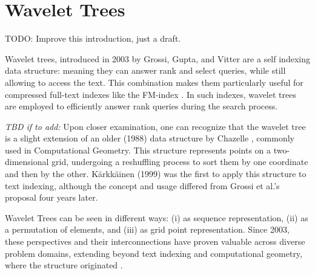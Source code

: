 \clearpage
\section{Wavelet Trees}
TODO: Improve this introduction, just a draft. \vspace{0.4cm}


\noindent Wavelet trees, introduced in 2003 by Grossi, Gupta, and Vitter \cite{GrossiWT2003,} are a self indexing data structure: meaning they can answer rank and select queries, while still allowing to access the text. This combination makes them particularly useful for compressed full-text indexes like the FM-index \cite{ferragina2000opportunistic}. In such indexes, wavelet trees are employed to efficiently answer rank queries during the search process. \vspace{0.4cm}


\noindent \emph{TBD if to add:} Upon closer examination, one can recognize that the wavelet tree is a slight extension of an older (1988) data structure by Chazelle \cite{Chazelle1988}, commonly used in Computational Geometry. This structure represents points on a two-dimensional grid, undergoing a reshuffling process to sort them by one coordinate and then by the other. Kärkkäinen (1999) \cite{karkkainen1999repetition} was the first to apply this structure to text indexing, although the concept and usage differed from Grossi et al.'s proposal four years later. \vspace{0.4cm}

\noindent Wavelet Trees can be seen in different ways: (i) as sequence representation, (ii) as a permutation of elements, and (iii) as grid point representation. Since 2003, these perspectives and their interconnections have proven valuable across diverse problem domains, extending beyond text indexing and computational geometry, where the structure originated \cite{WTForALL,WTFromTheoryToPractice,TheMyriadVirtuesWT}.

